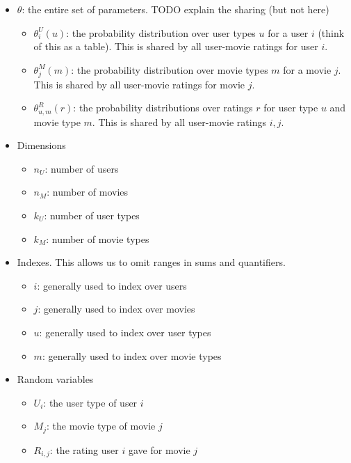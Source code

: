 \documentclass{article}
\begin{document}
\begin{itemize}
\item $\theta$: the entire set of parameters. TODO explain the sharing
  (but not here)
  \begin{itemize}
  \item $\theta^U_i(u)$: the probability distribution over user types
    $u$ for a user $i$ (think
    of this as a table). This is shared by all user-movie ratings for
    user $i$.
  \item $\theta^M_j(m)$: the probability distribution over movie
    types $m$ for a movie $j$. This is shared by all user-movie ratings for movie $j$.
  \item $\theta^R_{u,m}(r)$: the probability distributions over
    ratings $r$ for user type $u$ and movie type $m$. This is shared
    by all user-movie ratings $i,j$.
  \end{itemize}
\item Dimensions
  \begin{itemize}
  \item $n_U$: number of users
  \item $n_M$: number of movies
  \item $k_U$: number of user types
  \item $k_M$: number of movie types
  \end{itemize}
\item Indexes. This allows us to omit ranges in sums and quantifiers.
  \begin{itemize}
  \item $i$: generally used to index over users
  \item $j$: generally used to index over movies
  \item $u$: generally used to index over user types
  \item $m$: generally used to index over movie types
  \end{itemize}
\item Random variables
  \begin{itemize}
  \item $U_i$: the user type of user $i$
  \item $M_j$: the movie type of movie $j$
  \item $R_{i,j}$: the rating user $i$ gave for movie $j$
  \end{itemize}
\end{itemize}
\end{document}
